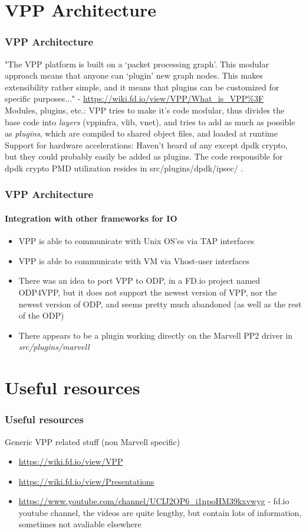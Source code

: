 \documentclass{beamer}
\begin{document}
\section{VPP Architecture}
  \begin{frame}
  \frametitle{VPP Architecture}
  "The VPP platform is built on a ‘packet processing graph’. This modular approach means that anyone can ‘plugin’ new graph nodes. This makes extensibility rather simple, and it means that plugins can be customized for specific purposes..." - \url{https://wiki.fd.io/view/VPP/What_is_VPP\%3F} \\
  {\tiny \color{blue} Modules, plugins, etc.:} {\tiny \color{red} VPP tries to make it's code
   modular, thus divides the base code into \textit{layers} (vppinfra, vlib, vnet), and tries to add as much
   as possible as \textit{plugins}, which are compiled to shared object files, and loaded at runtime} \\
  {\tiny \color{blue} Support for hardware accelerations:} {\tiny \color{red} Haven't heard of any except dpdk crypto, but they could probably easily be added as plugins. The code responsible for dpdk crypto PMD
  utilization resides in src/plugins/dpdk/ipsec/ .} \\

  \end{frame}
  
  \begin{frame}
  \frametitle{VPP Architecture}
  \framesubtitle{Integration with other frameworks for IO}
  \begin{itemize}
  \item VPP is able to communicate with Unix OS'es via TAP interfaces
  \item VPP is able to communicate with VM via Vhost-user interfaces
  \item There was an idea to port VPP to ODP, in a FD.io project named ODP4VPP, but it does not support
        the newest version of VPP, nor the newest version of ODP, and seems pretty much abandoned 
        {\tiny (as well as the rest of the ODP)}
  \item There appears to be a plugin working directly on the Marvell PP2 driver in \textit{src/plugins/marvell}
  \end{itemize}
  \end{frame}
  
\section{Useful resources}
  \begin{frame}
  \frametitle{Useful resources}
  Generic VPP related stuff (non Marvell specific)
  \begin{itemize}
  \item \url{https://wiki.fd.io/view/VPP}
  \item \url{https://wiki.fd.io/view/Presentations}
  \item \url{https://www.youtube.com/channel/UCIJ2OP6_i1npoHM39kxvwyg} - fd.io youtube channel, the
                       videos are quite lengthy, but contain lots of information, sometimes
                       not avaliable elsewhere
  \end{itemize}
  \end{frame}
\end{document}
